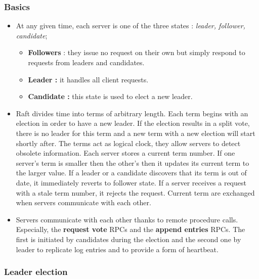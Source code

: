 \subsubsection{Basics}
\begin{itemize}

\item At any given time, each server is one of the three states : \textit{leader, follower, candidate}; 
\begin{itemize}
\item \textbf{Followers }: they issue no request on their own but simply respond to requests from leaders and candidates.
\item \textbf{Leader : } it handles all client requests.
\item \textbf{Candidate : } this state is used to elect a new leader.
\end{itemize}


\item Raft divides time into terms of arbitrary length. Each term begins with an election in order to have a new leader. If the election results in a split vote, there is no leader for this term and a new term with a new election will start shortly after. The terms act as logical clock, they allow servers to detect obsolete information. Each server stores a current term number. If one server's term is smaller then the other's then it updates its current term to the larger value. If a leader or a candidate discovers that its term is out of date, it immediately reverts to follower state. If a server receives a request with a stale term number, it rejects the request. Current term are exchanged when servers communicate with each other. 

\item Servers communicate with each other thanks to remote procedure calls. Especially, the \textbf{request vote} RPCs and the \textbf{append entries} RPCs. The first is initiated by candidates during the election and the second one by leader to replicate log entries and to provide a form of heartbeat. 

\end{itemize}

\subsubsection{Leader election}

